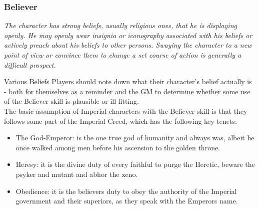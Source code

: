 	\subsubsection{Believer}\label{Believer}
		\textit{The character has strong beliefs, usually religious ones, that he is displaying openly.
		He may openly wear insignia or iconography associated with his beliefs or actively preach about his beliefs to other persons.
		Swaying the character to a new point of view or convince them to change a set course of action is generally a difficult prospect.}
		\begin{DndSidebar}{Various Beliefs}
			Players should note down what their character's belief actually is - both for themselves as a reminder and the GM to determine whether some use of the Believer skill is plausible or ill fitting.\\
			The basic assumption of Imperial characters with the Believer skill is that they follows some part of the Imperial Creed, which has the following key tenets:
			\begin{itemize}
				\item The God-Emperor: is the one true god of humanity and always was, albeit he once walked among men before his ascension to the golden throne.
				\item Heresy: it is the divine duty of every faithful to purge the Heretic, beware the psyker and mutant and abhor the xeno.
				\item Obedience: it is the believers duty to obey the authority of the Imperial government and their superiors, as they speak with the Emperors name.
			\end{itemize}
		\end{DndSidebar}
